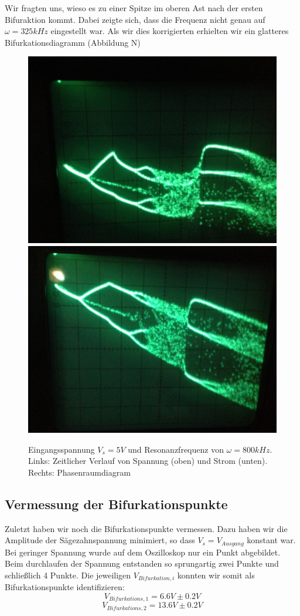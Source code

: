 \documentclass{scrartcl}
\begin{document}
Wir fragten uns, wieso es zu einer Spitze im oberen Ast nach der ersten Bifuraktion kommt. Dabei zeigte sich, dass die Frequenz nicht genau auf  $\omega=325kHz$ eingestellt war. Als wir dies korrigierten erhielten wir ein glatteres Bifurkationsdiagramm (Abbildung N)

\begin{figure}[!htbp]
\centering
\includegraphics[scale=0.18]{bif-ldr/bifurc-bad}
\includegraphics[scale=0.18]{bif-ldr/bifurc-good}
\caption{Eingangsspannung $V_s=5V$ und Resonanzfrequenz von $\omega=800kHz$. Links: Zeitlicher Verlauf von Spannung (oben) und Strom (unten). Rechts: Phasenraumdiagram}
\label{fig:ldr-bifurc}
\end{figure}
\subsection { Vermessung der Bifurkationspunkte }
Zuletzt haben wir noch die Bifurkationspunkte vermessen. Dazu haben wir die Amplitude der Sägezahnspannung minimiert, so dass $V_s=V_{Ausgang}$ konstant war. Bei geringer Spannung wurde auf dem Oszilloskop nur ein Punkt abgebildet. Beim durchlaufen der Spannung entstanden so sprungartig zwei Punkte und schließlich 4 Punkte. Die jeweiligen $V_{Bifurkation, i}$ konnten wir somit als Bifurkationspunkte identifizieren: 
$$V_{Bifurkations, 1}=6.6V \pm 0.2V$$
$$V_{Bifurkations, 2}=13.6V \pm 0.2V$$
\end{document}
